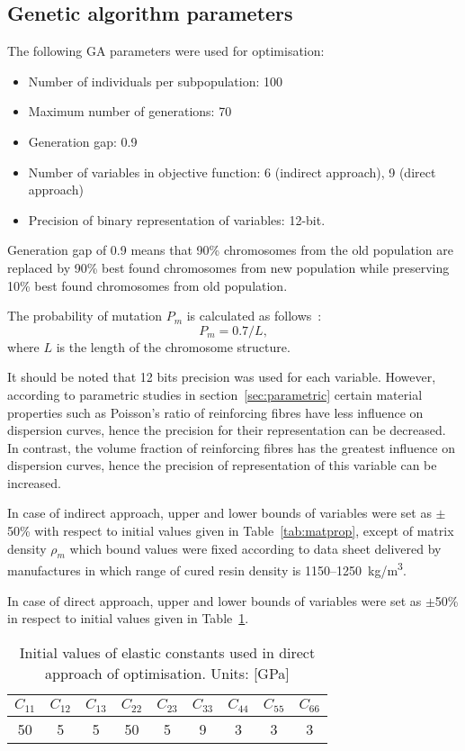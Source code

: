 \documentclass[preprint,12pt]{elsarticle}
\begin{document}
	\subsection{Genetic algorithm parameters}
	The following GA parameters were used for optimisation:
	\begin{itemize}
		\item Number of individuals per subpopulation: 100
		\item Maximum number of generations: 70
		\item Generation gap: 0.9
		\item Number of variables in objective function: 6 (indirect approach), 9 (direct approach)
		\item Precision of binary representation of variables: 12-bit.
   \end{itemize}
    Generation gap of 0.9 means that 90\% chromosomes from the old population are replaced by 90\% best found chromosomes from new population while preserving 10\% best found chromosomes from old population.
    
    The probability of mutation \(P_m\) is calculated as follows~\cite{Chipperfield1994}:
    \begin{equation}
    	P_m = 0.7/L,
    \end{equation}
    where \(L\) is the length of the chromosome structure.
    
    It should be noted that 12 bits precision was used for each variable. However, according to parametric studies in section~\ref{sec:parametric} certain material properties such as Poisson's ratio of reinforcing fibres have less influence on dispersion curves, hence the precision for their representation can be decreased. In contrast, the volume fraction of reinforcing fibres has the greatest influence on dispersion curves, hence the precision of representation of this variable can be increased.
  
	In case of indirect approach, upper and lower bounds of variables were set as 
	\(\pm\)50\% with respect to initial values given in Table~\ref{tab:matprop}, except of 
	matrix density \(\rho_m\) which bound values were fixed according to data sheet 
	delivered by manufactures in which range of cured resin density is 
	1150--1250~kg/m\textsuperscript{3}. 
	
	In case of direct approach, upper and lower bounds of variables were set as  
	\(\pm\)50\% in respect to initial values given in Table~\ref{tab:Ctensor_initial}.
	\begin{table}[h!]
		\renewcommand{\arraystretch}{1.3}
		\centering \footnotesize
		\caption{Initial values of elastic constants used in direct approach of optimisation. Units: [GPa]}
		\begin{tabular}{ccccccccc} 
			\toprule
			\(C_{11}\) & \(C_{12}\) & \(C_{13}\)  & \(C_{22}\) & \(C_{23}\) & \(C_{33}\) & 
			\(C_{44}\)  & \(C_{55}\) & \(C_{66}\) \\
			\midrule
			50 &5& 5&  50 & 5 & 9 & 3 & 3 & 3\\
			\bottomrule 
		\end{tabular} 
		\label{tab:Ctensor_initial}
	\end{table}
\end{document}
